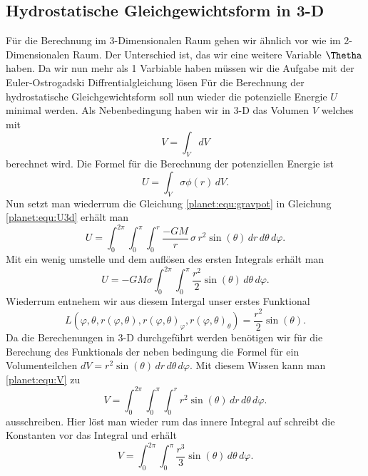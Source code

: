 \subsection{Hydrostatische Gleichgewichtsform in 3-D}
Für die Berechnung im 3-Dimensionalen Raum gehen wir ähnlich vor wie im 2-Dimensionalen Raum.
Der Unterschied ist, das wir eine weitere Variable \(\Thetha\) haben.
Da wir nun mehr als 1 Varbiable haben müssen wir die Aufgabe mit der Euler-Ostrogadski Diffrentialgleichung lösen
Für die Berechnung der hydrostatische Gleichgewichtsform soll nun wieder die potenzielle Energie \(U\) minimal werden.
Als Nebenbedingung haben wir in 3-D das Volumen \(V\) welches mit 
\begin{equation}
	V = \int_{V}^{} dV
	\label{planet:equ:V}
\end{equation}
berechnet wird.
Die Formel für die Berechnung der potenziellen Energie ist
\begin{equation}
	U = \int_{V} \sigma  \phi (r)\, dV.
	\label{planet:equ:U3d}
\end{equation}
Nun setzt man wiederrum die Gleichung \ref{planet:equ:gravpot} in Gleichung \ref{planet:equ:U3d} erhält man
\begin{equation*}
	U = \int_{0}^{2\pi}\int_{0}^{\pi}\int_{0}^{r} \frac{-GM}{r}\, \sigma\, r^2 \sin (\theta) \, dr \, d\theta \, d\varphi.
\end{equation*}
Mit ein wenig umstelle und dem auflösen des ersten Integrals erhält man
\begin{equation*}
	U =-GM\sigma \int_{0}^{2\pi}\int_{0}^{\pi}\frac{r^2}{2}  \sin (\theta) \, d\theta \, d\varphi.
\end{equation*}
Wiederrum entnehem wir aus diesem Intergal unser erstes Funktional
\begin{equation*}
	L(\varphi,\theta ,r(\varphi,\theta),r(\varphi,\theta)_\varphi,r(\varphi,\theta)_\theta) = \frac{r^2}{2}  \sin (\theta).
\end{equation*}
Da die Berechenungen in 3-D durchgeführt werden benötigen wir für die Berechung des Funktionals der neben bedingung die Formel für ein Volumenteilchen \(dV = r^2 \sin (\theta) \, dr \, d\theta \, d\varphi \).
Mit diesem Wissen kann man \ref{planet:equ:V} zu
\begin{equation*}
	V = \int_{0}^{2\pi}\int_{0}^{\pi}\int_{0}^{r} r^2 \sin (\theta) \, dr \, d\theta \, d\varphi.
\end{equation*}
ausschreiben.
Hier löst man wieder rum das innere Integral auf schreibt die Konstanten vor das Integral und erhält
\begin{equation*}
	V = \int_{0}^{2\pi}\int_{0}^{\pi}\frac{r^3}{3} \sin (\theta) \, d\theta \, d\varphi.
\end{equation*}
